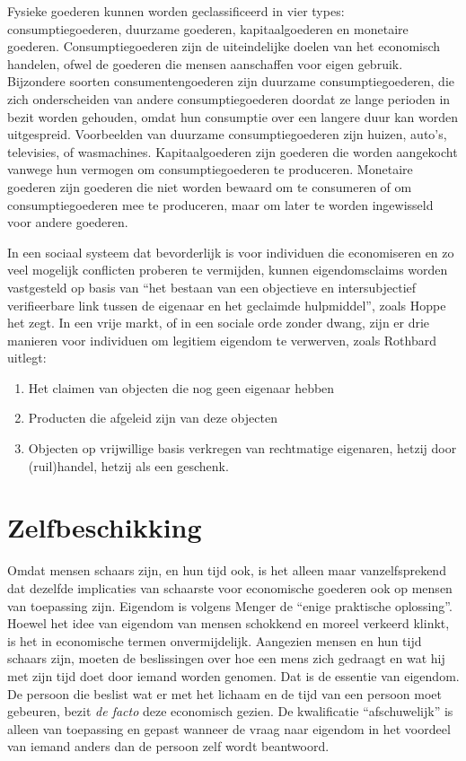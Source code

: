 Fysieke goederen kunnen worden geclassificeerd in vier types: consumptiegoederen, duurzame goederen, kapitaalgoederen en monetaire goederen. Consumptiegoederen zijn de uiteindelijke doelen van het economisch handelen, ofwel de goederen die mensen aanschaffen voor eigen gebruik. Bijzondere soorten consumentengoederen zijn duurzame consumptiegoederen, die zich onderscheiden van andere consumptiegoederen doordat ze lange perioden in bezit worden gehouden, omdat hun consumptie over een langere duur kan worden uitgespreid. Voorbeelden van duurzame consumptiegoederen zijn huizen, auto's, televisies, of wasmachines. Kapitaalgoederen zijn goederen die worden aangekocht vanwege hun vermogen om consumptiegoederen te produceren. Monetaire goederen zijn goederen die niet worden bewaard om te consumeren of om consumptiegoederen mee te produceren, maar om later te worden ingewisseld voor andere goederen.

In een sociaal systeem dat bevorderlijk is voor individuen die economiseren en zo veel mogelijk conflicten proberen te vermijden, kunnen eigendomsclaims worden vastgesteld op basis van \enquote{het bestaan van een objectieve en intersubjectief verifieerbare link tussen de eigenaar en het geclaimde hulpmiddel}, zoals Hoppe het zegt.\autocite{53} In een vrije markt, of in een sociale orde zonder dwang, zijn er drie manieren voor individuen om legitiem eigendom te verwerven, zoals Rothbard uitlegt:

\begin{enumerate}
\def\labelenumi{\arabic{enumi}.}
\item Het claimen van objecten die nog geen eigenaar hebben
\item Producten die afgeleid zijn van deze objecten
\item Objecten op vrijwillige basis verkregen van rechtmatige eigenaren, hetzij door (ruil)handel, hetzij als een geschenk.
\end{enumerate}

\section{Zelfbeschikking}

Omdat mensen schaars zijn, en hun tijd ook, is het alleen maar vanzelfsprekend dat dezelfde implicaties van schaarste voor economische goederen ook op mensen van toepassing zijn. Eigendom is volgens Menger de \enquote{enige praktische oplossing}. Hoewel het idee van eigendom van mensen schokkend en moreel verkeerd klinkt, is het in economische termen onvermijdelijk. Aangezien mensen en hun tijd schaars zijn, moeten de beslissingen over hoe een mens zich gedraagt en wat hij met zijn tijd doet door iemand worden genomen. Dat is de essentie van eigendom. De persoon die beslist wat er met het lichaam en de tijd van een persoon moet gebeuren, bezit \emph{de facto} deze economisch gezien. De kwalificatie \enquote{afschuwelijk} is alleen van toepassing en gepast wanneer de vraag naar eigendom in het voordeel van iemand anders dan de persoon zelf wordt beantwoord.

